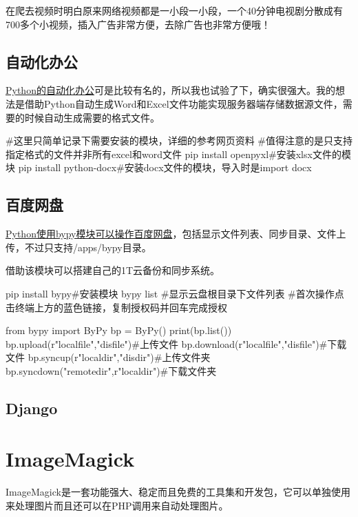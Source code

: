在爬去视频时明白原来网络视频都是一小段一小段，一个40分钟电视剧分散成有700多个小视频，插入广告非常方便，去除广告也非常方便哦！
\subsection{自动化办公}
\href{https://blog.csdn.net/weixin_41261833/article/details/106028038?spm=1001.2014.3001.5506}{Python的自动化办公}可是比较有名的，所以我也试验了下，确实很强大。我的想法是借助Python自动生成Word和Excel文件功能实现服务器端存储数据源文件，需要的时候自动生成需要的格式文件。
\begin{shell}
#这里只简单记录下需要安装的模块，详细的参考网页资料
#值得注意的是只支持指定格式的文件并非所有excel和word文件
pip install openpyxl#安装xlsx文件的模块
pip install python-docx#安装docx文件的模块，导入时是import docx
\end{shell}

\subsection{百度网盘}
\href{https://blog.csdn.net/u010751000/article/details/130191192?ops_request_misc=%257B%2522request%255Fid%2522%253A%25221986353ffb0d0d65f2126a7f2b677eda%2522%252C%2522scm%2522%253A%252220140713.130102334..%2522%257D&request_id=1986353ffb0d0d65f2126a7f2b677eda&biz_id=0&utm_medium=distribute.pc_search_result.none-task-blog-2~all~sobaiduend~default-2-130191192-null-null.142^v101^pc_search_result_base7&utm_term=python%E7%99%BE%E5%BA%A6%E7%BD%91%E7%9B%98&spm=1018.2226.3001.4187}{Python使用bypy模块可以操作百度网盘}，包括显示文件列表、同步目录、文件上传，不过只支持/apps/bypy目录。

借助该模块可以搭建自己的1T云备份和同步系统。
\begin{shell}
pip install bypy#安装模块
bypy list #显示云盘根目录下文件列表
#首次操作点击终端上方的蓝色链接，复制授权码并回车完成授权
\end{shell}
\begin{shell}
from bypy import ByPy
bp = ByPy()
print(bp.list())
bp.upload(r"localfile","disfile")#上传文件
bp.download(r"localfile","disfile")#下载文件
bp.syncup(r"localdir","disdir")#上传文件夹
bp.syncdown("remotedir",r"localdir")#下载文件夹
\end{shell}
\subsection{Django}
\section{ImageMagick}
ImageMagick是一套功能强大、稳定而且免费的工具集和开发包，它可以单独使用来处理图片而且还可以在PHP调用来自动处理图片。

